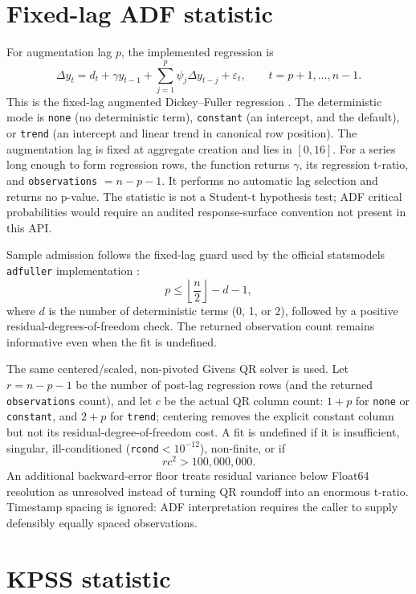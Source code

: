 \documentclass[11pt]{article}
\begin{document}
\section{Fixed-lag ADF statistic}

For augmentation lag $p$, the implemented regression is
\[
\Delta y_t=d_t+\gamma y_{t-1}
 +\sum_{j=1}^{p}\psi_j\Delta y_{t-j}+\varepsilon_t,
\qquad t=p+1,\ldots,n-1.
\]
This is the fixed-lag augmented Dickey--Fuller regression \cite{dickeyfuller1979,saiddickey1984}.
The deterministic mode is \texttt{none} (no deterministic term), \texttt{constant} (an intercept, and the default), or \texttt{trend} (an intercept and linear trend in canonical row position). The augmentation lag is fixed at aggregate creation and lies in $[0,16]$. For a series long enough to form regression rows, the function returns $\gamma$, its regression t-ratio, and \texttt{observations} $=n-p-1$. It performs no automatic lag selection and returns no p-value. The statistic is not a Student-t hypothesis test; ADF critical probabilities would require an audited response-surface convention not present in this API.

Sample admission follows the fixed-lag guard used by the official statsmodels \texttt{adfuller} implementation \cite{statsmodels_adfuller_source}:
\[
p\le\left\lfloor\frac n2\right\rfloor-d-1,
\]
where $d$ is the number of deterministic terms (0, 1, or 2), followed by a positive residual-degrees-of-freedom check. The returned observation count remains informative even when the fit is undefined.

The same centered/scaled, non-pivoted Givens QR solver is used. Let $r=n-p-1$ be the number of post-lag regression rows (and the returned \texttt{observations} count), and let $c$ be the actual QR column count: $1+p$ for \texttt{none} or \texttt{constant}, and $2+p$ for \texttt{trend}; centering removes the explicit constant column but not its residual-degree-of-freedom cost. A fit is undefined if it is insufficient, singular, ill-conditioned (\texttt{rcond}$<10^{-12}$), non-finite, or if
\[
r c^2>100{,}000{,}000.
\]
An additional backward-error floor treats residual variance below Float64 resolution as unresolved instead of turning QR roundoff into an enormous t-ratio. Timestamp spacing is ignored: ADF interpretation requires the caller to supply defensibly equally spaced observations.

\section{KPSS statistic}
\end{document}
